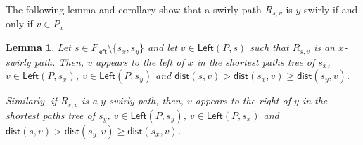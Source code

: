 \documentclass{article}
\newcommand{\Left}{\mathsf{Left}}
\newcommand{\leftside}{\mathsf{left}}
\newcommand{\dist}{\mathsf{dist}}
\newtheorem{lemma}{Lemma}
\begin{document}
The following lemma and corollary show that a swirly path $R_{s,v}$ is $y$-swirly if and only if $v\in P_x$.







\begin{lemma}\label{lem:s-x-swirl}
    Let $s\in F_{\leftside}\setminus\{s_x,s_y\}$ and let $v\in \Left(P,s)$ such that $R_{s,v}$ is an $x$-swirly path.
    Then, $v$ appears to the left of $x$ in the shortest paths tree of $s_x$, $v\in\Left(P,s_x)$, $v\in \Left(P,s_y)$ and $\dist(s,v)>\dist(s_x,v)\ge\dist(s_y,v)$.

    Similarly, if $R_{s,v}$ is a $y$-swirly path, then, $v$ appears to the right of $y$ in the shortest paths tree of $s_y$, $v\in\Left(P,s_y)$, $v\in \Left(P,s_x)$ and $\dist(s,v)>\dist(s_y,v)\ge\dist(s_x,v)$. .
\end{lemma}
\end{document}
